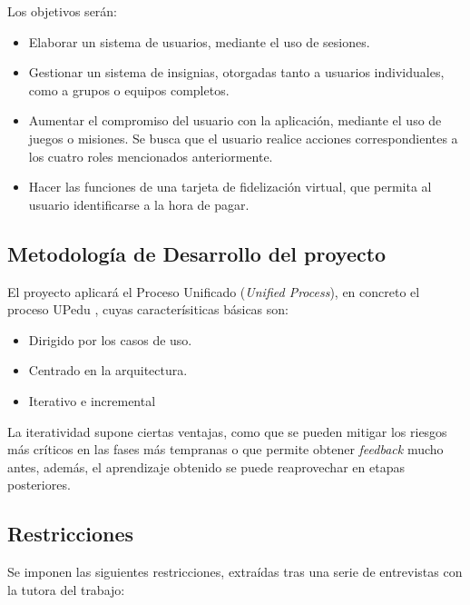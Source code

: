 \documentclass[twoside]{report}
\begin{document}
Los objetivos serán:
\begin{itemize}
	\item Elaborar un sistema de usuarios, mediante el uso de sesiones.
	\item Gestionar un sistema de insignias, otorgadas tanto a usuarios individuales, como a grupos o equipos completos.
	\item Aumentar el compromiso del usuario con la aplicación, mediante el uso de juegos o misiones. Se busca que el usuario realice acciones correspondientes a los cuatro roles mencionados anteriormente.
	\item Hacer las funciones de una tarjeta de fidelización virtual, que permita al usuario identificarse a la hora de pagar.
\end{itemize}

\subsection{Metodología de Desarrollo del proyecto}
El proyecto aplicará el Proceso Unificado (\textit{Unified Process}), en concreto el proceso UPedu \cite{upedu}, cuyas caracterísiticas básicas \cite{pgpup} son: 
\begin{itemize}
\item Dirigido por los casos de uso.
\item Centrado en la arquitectura.
\item Iterativo e incremental
\end{itemize}
La iteratividad supone ciertas ventajas, como que se pueden mitigar los riesgos más críticos en las fases más tempranas o que permite obtener \textit{feedback} mucho antes, además, el aprendizaje obtenido se puede reaprovechar en etapas posteriores.

\subsection{Restricciones}
Se imponen las siguientes restricciones, extraídas tras una serie de entrevistas con la tutora del trabajo:
\end{document}
